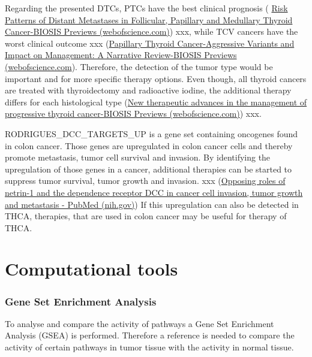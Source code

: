 \documentclass[
  parskip,
  oneside]{scrreprt}
\begin{document}
Regarding the presented DTCs, PTCs have the best clinical prognosis (
\href{https://www.webofscience.com/wos/biosis/full-record/BIOSIS:PREV202200394234}{Risk
Patterns of Distant Metastases in Follicular, Papillary and Medullary
Thyroid Cancer-BIOSIS Previews (webofscience.com)}) xxx, while TCV
cancers have the worst clinical outcome xxx
(\href{https://www.webofscience.com/wos/biosis/full-record/BIOSIS:PREV202000606704}{Papillary
Thyroid Cancer-Aggressive Variants and Impact on Management: A Narrative
Review-BIOSIS Previews (webofscience.com}). Therefore, the detection of
the tumor type would be important and for more specific therapy options.
Even though, all thyroid cancers are treated with thyroidectomy and
radioactive iodine, the additional therapy differs for each histological
type
(\href{https://www.webofscience.com/wos/biosis/full-record/BIOSIS:PREV201000061254}{New
therapeutic advances in the management of progressive thyroid
cancer-BIOSIS Previews (webofscience.com)}) xxx.

RODRIGUES\_DCC\_TARGETS\_UP is a gene set containing oncogenes found in
colon cancer. Those genes are upregulated in colon cancer cells and
thereby promote metastasis, tumor cell survival and invasion. By
identifying the upregulation of those genes in a cancer, additional
therapies can be started to suppress tumor survival, tumor growth and
invasion. xxx (\href{https://pubmed.ncbi.nlm.nih.gov/17334389/}{Opposing
roles of netrin-1 and the dependence receptor DCC in cancer cell
invasion, tumor growth and metastasis - PubMed (nih.gov)}) If this
upregulation can also be detected in THCA, therapies, that are used in
colon cancer may be useful for therapy of THCA.

\hypertarget{computational-tools}{%
\section{Computational tools}\label{computational-tools}}

\hypertarget{gene-set-enrichment-analysis}{%
\subsubsection{Gene Set Enrichment
Analysis}\label{gene-set-enrichment-analysis}}

To analyse and compare the activity of pathways a Gene Set Enrichment
Analysis (GSEA) is performed. Therefore a reference is needed to compare
the activity of certain pathways in tumor tissue with the activity in
normal tissue.
\end{document}
